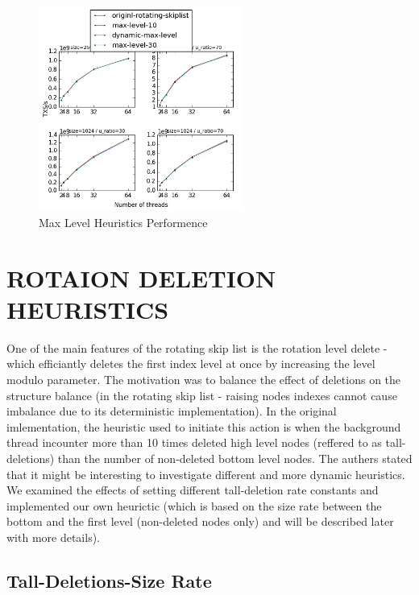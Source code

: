 \documentclass{article}
\begin{document}
\begin{figure}
	\caption{Max Level Heuristics Performence}
	\centering
	\includegraphics[width=0.6\textwidth]{max-level_plot}
\end{figure}


\section{ROTAION DELETION HEURISTICS}
\label{sec:rdh}

One of the main features of the rotating skip list is the rotation level delete - which efficiantly deletes the first index level at once by increasing the level modulo parameter. The motivation was to balance the effect of deletions on the structure balance (in the rotating skip list - raising nodes indexes cannot cause imbalance due to its deterministic implementation). In the original imlementation, the heuristic used to initiate this action is when the background thread incounter more than 10 times deleted high level nodes (reffered to as tall-deletions) than the number of non-deleted bottom level nodes. The authers stated that it might be interesting to investigate different and more dynamic heuristics. We examined the effects of setting different tall-deletion rate constants and implemented our own heurictic (which is based on the size rate between the bottom and the first level (non-deleted nodes only) and will be described later with more details).

\subsection{Tall-Deletions-Size Rate}
\label{ssec:tds}
\end{document}
